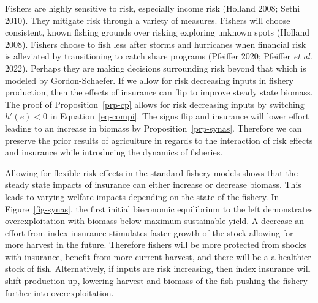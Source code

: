 \documentclass[
  letterpaper,
  DIV=11,
  numbers=noendperiod]{scrartcl}
\theoremstyle{plain}
\theoremstyle{plain}
\theoremstyle{remark}
\begin{document}
Fishers are highly sensitive to risk, especially income risk (Holland
2008; Sethi 2010). They mitigate risk through a variety of measures.
Fishers will choose consistent, known fishing grounds over risking
exploring unknown spots (Holland 2008). Fishers choose to fish less
after storms and hurricanes when financial risk is alleviated by
transitioning to catch share programs (Pfeiffer 2020; Pfeiffer \emph{et
al.} 2022). Perhaps they are making decisions surrounding risk beyond
that which is modeled by Gordon-Schaefer. If we allow for risk
decreasing inputs in fishery production, then the effects of insurance
can flip to improve steady state biomass. The proof of
Proposition~\ref{prp-cp} allows for risk decreasing inputs by switching
\(h'(e)<0\) in Equation~\ref{eq-compi}. The signs flip and insurance
will lower effort leading to an increase in biomass by
Proposition~\ref{prp-synas}. Therefore we can preserve the prior results
of agriculture in regards to the interaction of risk effects and
insurance while introducing the dynamics of fisheries.

Allowing for flexible risk effects in the standard fishery models shows
that the steady state impacts of insurance can either increase or
decrease biomass. This leads to varying welfare impacts depending on the
state of the fishery. In Figure~\ref{fig-synas}, the first initial
bieconomic equilibrium to the left demonstrates overexploitation with
biomass below maximum sustainable yield. A decrease an effort from index
insurance stimulates faster growth of the stock allowing for more
harvest in the future. Therefore fishers will be more protected from
shocks with insurance, benefit from more current harvest, and there will
be a a healthier stock of fish. Alternatively, if inputs are risk
increasing, then index insurance will shift production up, lowering
harvest and biomass of the fish pushing the fishery further into
overexploitation.
\end{document}
